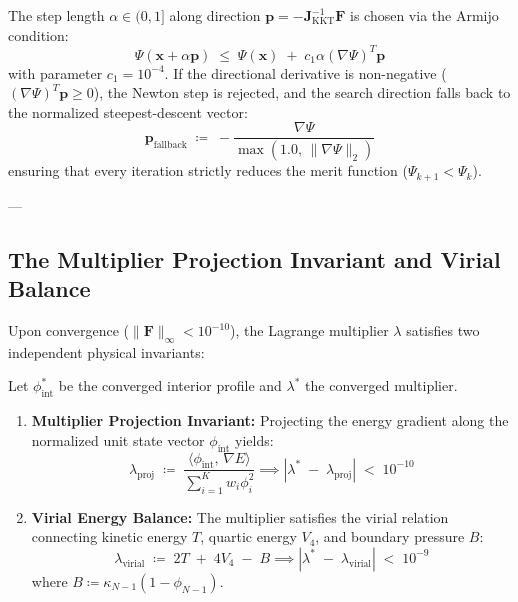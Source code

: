 \documentclass[
    12pt,
    a4paper,
    headings=normal,
    twoside=false,
    open=any,
    parskip=half
]{scrbook}
\begin{document}
\begin{phystheorem}\label{thm:ch3_armijo_fallback}
The step length $\alpha \in (0, 1]$ along direction $\mathbf{p} = -\mathbf{J}_{\text{KKT}}^{-1}\mathbf{F}$ is chosen via the Armijo condition:
\begin{equation}
\Psi(\mathbf{x} + \alpha \mathbf{p}) \;\le\; \Psi(\mathbf{x}) \;+\; c_1 \alpha \left( \nabla \Psi \right)^T \mathbf{p}
\label{eq:ch3_armijo_condition}
\end{equation}
with parameter $c_1 = 10^{-4}$. If the directional derivative is non-negative ($(\nabla\Psi)^T \mathbf{p} \ge 0$), the Newton step is rejected, and the search direction falls back to the normalized steepest-descent vector:
\begin{equation}
\mathbf{p}_{\text{fallback}} \;\coloneqq\; -\frac{\nabla \Psi}{\max\left( 1.0, \, \|\nabla\Psi\|_2 \right)}
\label{eq:ch3_descent_fallback}
\end{equation}
ensuring that every iteration strictly reduces the merit function ($\Psi_{k+1} < \Psi_k$).
\end{phystheorem}

---

\subsection{The Multiplier Projection Invariant and Virial Balance}

Upon convergence ($\|\mathbf{F}\|_\infty < 10^{-10}$), the Lagrange multiplier $\lambda$ satisfies two independent physical invariants:

\begin{phystheorem}\label{thm:ch3_multiplier_invariants}
Let $\phi_{\text{int}}^*$ be the converged interior profile and $\lambda^*$ the converged multiplier.
\begin{enumerate}[label=(\alph*), noitemsep]
    \item \textbf{Multiplier Projection Invariant:} Projecting the energy gradient along the normalized unit state vector $\phi_{\text{int}}$ yields:
    \begin{equation}
    \boxed{\lambda_{\text{proj}} \;\coloneqq\; \frac{\langle \phi_{\text{int}}, \, \nabla E \rangle}{\sum_{i=1}^K w_i \phi_i^2} \implies \left| \lambda^* \;-\; \lambda_{\text{proj}} \right| \;<\; 10^{-10}}
    \label{eq:ch3_multiplier_projection_invariant}
    \end{equation}
    \item \textbf{Virial Energy Balance:} The multiplier satisfies the virial relation connecting kinetic energy $T$, quartic energy $V_4$, and boundary pressure $B$:
    \begin{equation}
    \boxed{\lambda_{\text{virial}} \;\coloneqq\; 2 T \;+\; 4 V_4 \;-\; B \implies \left| \lambda^* \;-\; \lambda_{\text{virial}} \right| \;<\; 10^{-9}}
    \label{eq:ch3_virial_balance_invariant}
    \end{equation}
    where $B \coloneqq \kappa_{N-1} (1 - \phi_{N-1})$.
\end{enumerate}
\end{phystheorem}
\end{document}
